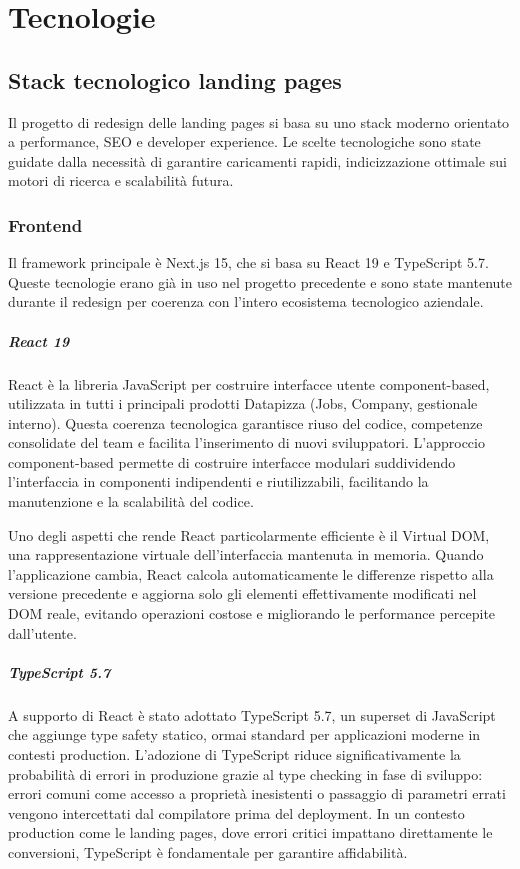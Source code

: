 \chapter{Tecnologie}

\section{Stack tecnologico landing pages}
Il progetto di redesign delle landing pages si basa su uno stack moderno 
orientato a performance, SEO e developer experience. Le scelte tecnologiche 
sono state guidate dalla necessità di garantire caricamenti rapidi, 
indicizzazione ottimale sui motori di ricerca e scalabilità futura.

\subsection{Frontend}

Il framework principale è Next.js 15, che si basa su React 19 e TypeScript 
5.7. Queste tecnologie erano già in uso nel progetto precedente e sono 
state mantenute durante il redesign per coerenza con l'intero ecosistema 
tecnologico aziendale.

\paragraph{React 19}
React è la libreria JavaScript per costruire interfacce utente component-based, 
utilizzata in tutti i principali prodotti Datapizza (Jobs, Company, gestionale 
interno). Questa coerenza tecnologica garantisce riuso del codice, competenze 
consolidate del team e facilita l'inserimento di nuovi sviluppatori. L'approccio 
component-based permette di costruire interfacce modulari suddividendo 
l'interfaccia in componenti indipendenti e riutilizzabili, facilitando la 
manutenzione e la scalabilità del codice.

Uno degli aspetti che rende React particolarmente efficiente è il Virtual DOM, 
una rappresentazione virtuale dell'interfaccia mantenuta in memoria. Quando 
l'applicazione cambia, React calcola automaticamente le differenze rispetto 
alla versione precedente e aggiorna solo gli elementi effettivamente modificati 
nel DOM reale, evitando operazioni costose e migliorando le performance 
percepite dall'utente.

\paragraph{TypeScript 5.7}
A supporto di React è stato adottato TypeScript 5.7, un superset di 
JavaScript che aggiunge type safety statico, ormai standard per applicazioni 
moderne in contesti production. L'adozione di TypeScript riduce significativamente 
la probabilità di errori in produzione grazie al type checking in fase di 
sviluppo: errori comuni come accesso a proprietà inesistenti o passaggio di 
parametri errati vengono intercettati dal compilatore prima del deployment. 
In un contesto production come le landing pages, dove errori critici impattano 
direttamente le conversioni, TypeScript è fondamentale per garantire affidabilità.

